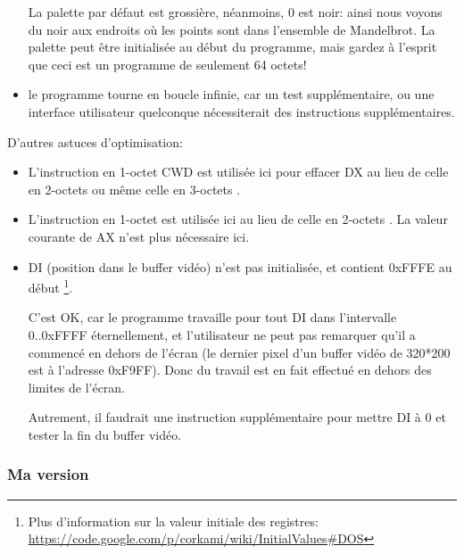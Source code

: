 \begin{itemize}
La palette par défaut est grossière, néanmoins, 0 est noir: ainsi nous voyons du noir
aux endroits où les points sont dans l'ensemble de Mandelbrot.
La palette peut être initialisée au début du programme, mais gardez à l'esprit que
ceci est un programme de seulement 64 octets!

\item le programme tourne en boucle infinie, car un test supplémentaire, ou une interface
utilisateur quelconque nécessiterait des instructions supplémentaires.

\end{itemize}

D'autres astuces d'optimisation:

\begin{itemize}
\item L'instruction en 1-octet CWD est utilisée ici
pour effacer DX au lieu de celle en 2-octets  ou même celle en 3-octets .

\item L'instruction en 1-octet  est utilisée ici au lieu de celle en 2-octets
. 
La valeur courante de AX n'est plus nécessaire ici.

\item DI (position dans le buffer vidéo) n'est pas initialisée, et contient 0xFFFE au début
\footnote{Plus d'information sur la valeur initiale des registres:
\url{https://code.google.com/p/corkami/wiki/InitialValues#DOS}}.

C'est OK, car le programme travaille pour tout DI dans l'intervalle 0..0xFFFF éternellement,
et l'utilisateur ne peut pas remarquer qu'il a commencé en dehors de l'écran (le
dernier pixel d'un buffer vidéo de 320*200 est à l'adresse 0xF9FF).
Donc du travail est en fait effectué en dehors des limites de l'écran.

Autrement, il faudrait une instruction supplémentaire pour mettre DI à 0 et tester
la fin du buffer vidéo.

\end{itemize}

\newcommand{\MyFixedVersion}{Ma version }
\subsubsection{\MyFixedVersion}




